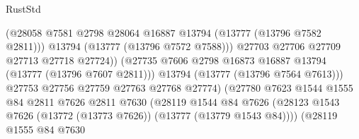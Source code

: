 \begin{lexlean}{RustStd}
\begin{coremodule}
                                              (@28058
                                                @7581
                                                @2798
                                                @28064
                                                @16887
                                                @13794
                                                (@13777 (@13796 @7582 @2811)))
                                              @13794
                                              (@13777 (@13796 @7572 @7588)))
                                            @27703
                                            @27706
                                            @27709
                                            @27713
                                            @27718
                                            @27724))
                                        (@27735
                                          @7606
                                          @2798
                                          @16873
                                          @16887
                                          @13794
                                          (@13777 (@13796 @7607 @2811)))
                                        @13794
                                        (@13777 (@13796 @7564 @7613)))
                                      @27753
                                      @27756
                                      @27759
                                      @27763
                                      @27768
                                      @27774)
                                    (@27780
                                      @7623
                                      @1544
                                      @1555
                                      @84
                                      @2811
                                      @7626
                                      @2811
                                      @7630
                                      (@28119
                                        @1544
                                        @84
                                        @7626
                                        (@28123
                                          @1543
                                          @7626
                                          (@13772 (@13773 @7626))
                                          (@13777 (@13779 @1543 @84))))
                                      (@28119
                                        @1555
                                        @84
                                        @7630

\end{coremodule}
\end{lexlean}
